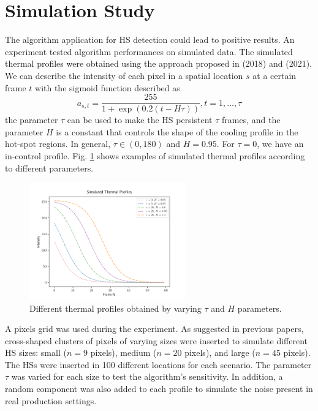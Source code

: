 \section{Simulation Study}
\label{sec:simstudy}
The algorithm application for HS detection could lead to positive results. An experiment tested algorithm performances on simulated data. The simulated thermal profiles were obtained using the approach proposed in \cite{colosimo_spatially_2018} (2018) and \citeauthor{yan_real-time_2021} (2021). We can describe the intensity of each pixel in a spatial location $s$ at a certain frame $t$ with the sigmoid function described as
\begin{equation}
    \label{eq:simulation}
    a_{s, t}=\frac{255}{1+\exp (0.2(t-H \tau))}, t=1, \ldots, \tau
\end{equation}
the parameter $\tau$ can be used to make the HS persistent $\tau$ frames, and the parameter $H$ is a constant that controls the shape of the cooling profile in the hot-spot regions. In general, $\tau \in \left(0,180\right)$ and $H=0.95$. For $\tau=0$, we have an in-control profile. Fig. \ref{fig:simulationprofile} shows examples of simulated thermal profiles according to different parameters.
\begin{figure}
    \centering
    \includegraphics[width=0.6\textwidth]{Images/simulation.png}
   \caption[Simulated profiles.]{Different thermal profiles obtained by varying $\tau$ and $H$ parameters.}
    \label{fig:simulationprofile}
\end{figure}
A  pixels grid was used during the experiment. As suggested in previous papers, cross-shaped clusters of pixels of varying sizes were inserted to simulate different HS sizes: small ($n=9$ pixels), medium ($n=20$ pixels), and large ($n=45$ pixels). The HSs were inserted in 100 different locations for each scenario. The parameter $\tau$ was varied for each size to test the algorithm's sensitivity. In addition, a random component was also added to each profile to simulate the noise present in real production settings.
